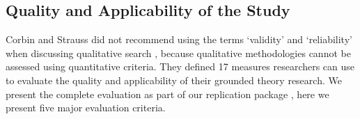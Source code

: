 






\subsection{Quality and Applicability of the Study}
Corbin and Strauss did not recommend using the terms `validity' and `reliability' when discussing qualitative search \cite{corbin2014gt}, because qualitative methodologies cannot be assessed using quantitative criteria. They defined 17 measures researchers can use to evaluate the quality and applicability of their grounded theory research. We present the complete evaluation as part of our replication package \cite{website:replication-package}, here we present five major evaluation criteria.

